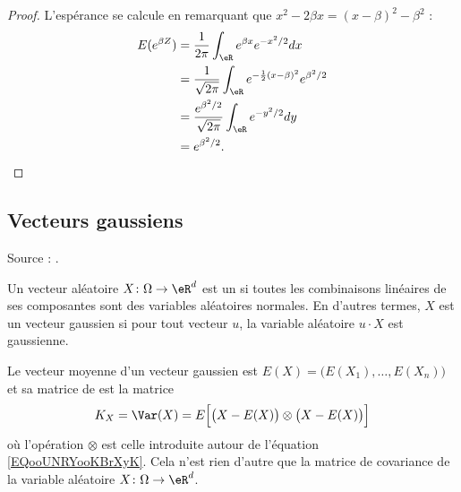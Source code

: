 \begin{proof}
	L'espérance se calcule en remarquant que \( x^2-2\beta x=(x-\beta)^2-\beta^2\) :
	\begin{subequations}        \label{EqEspexpbetaZnorm}
		\begin{align}
			E( e^{\beta Z}) & =\frac{1}{ 2\pi }\int_{\eR} e^{\beta x} e^{-x^2/2}dx                           \\
			                & =\frac{1}{ \sqrt{2\pi} }\int_{\eR} e^{-\frac{ 1 }{2}(x-\beta)^2} e^{\beta^2/2} \\
			                & =\frac{  e^{\beta^2/2} }{ \sqrt{2\pi} }\int_{\eR} e^{-y^2/2}dy                 \\
			                & = e^{\beta^2/2}.
		\end{align}
	\end{subequations}
\end{proof}

\subsection{Vecteurs gaussiens}

Source : \cite{ProbaDanielLi,GaussienYoann}.

\begin{definition}
	Un vecteur aléatoire \( X\colon \Omega\to \eR^d\) est un  si toutes les combinaisons linéaires de ses composantes sont des variables aléatoires normales. En d'autres termes, \( X\) est un vecteur gaussien si pour tout vecteur \( u\), la variable aléatoire \( u\cdot X\) est gaussienne.
\end{definition}

Le vecteur moyenne d'un vecteur gaussien est \( E(X)=\big( E(X_1),\ldots, E(X_n) \big)\) et sa matrice de  est la matrice
\begin{equation}
	K_X=\Var(X)=E\Big[ \big( X-E(X) \big)\otimes \big( X-E(X) \big) \Big]
\end{equation}
où l'opération \( \otimes\) est celle introduite autour de l'équation \eqref{EQooUNRYooKBrXyK}. Cela n'est rien d'autre que la matrice de covariance de la variable aléatoire \( X\colon \Omega\to \eR^d\).

